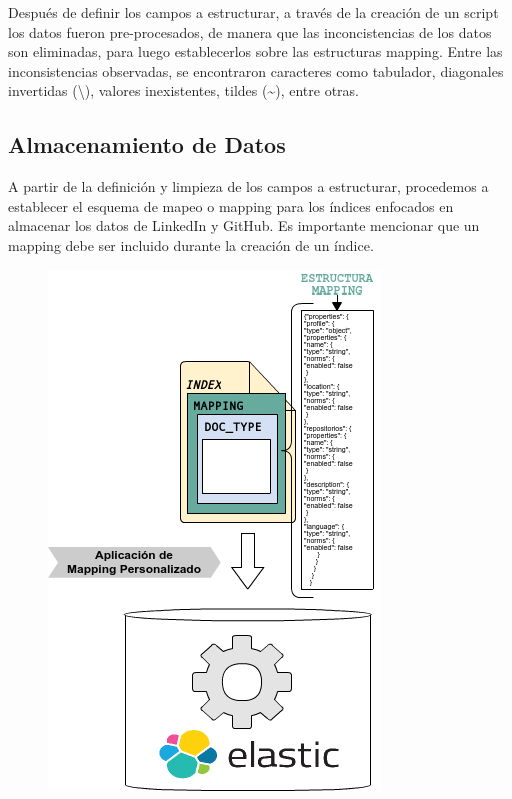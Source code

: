 Después de definir los campos a estructurar, a través de la creación de un script los datos fueron pre-procesados, de manera que las inconcistencias de los datos son eliminadas, para luego establecerlos sobre las estructuras mapping. Entre las inconsistencias observadas, se encontraron caracteres como tabulador, diagonales invertidas (\textbackslash{}), valores inexistentes, tildes (\textasciitilde{}), entre otras.

\subsection{Almacenamiento de Datos}
\label{subsec:subsec04}

A partir de la definición y limpieza de los campos a estructurar, procedemos a establecer el esquema de mapeo o mapping para los índices enfocados en almacenar los datos de LinkedIn y GitHub. Es importante mencionar que un mapping debe ser incluido durante la creación de un índice.

\begin{figure}[H]
	\centering
	\includegraphics[height=0.325\textheight]{fig01/apply_mapping}
	\label{fig:RHP02}
\end{figure}


